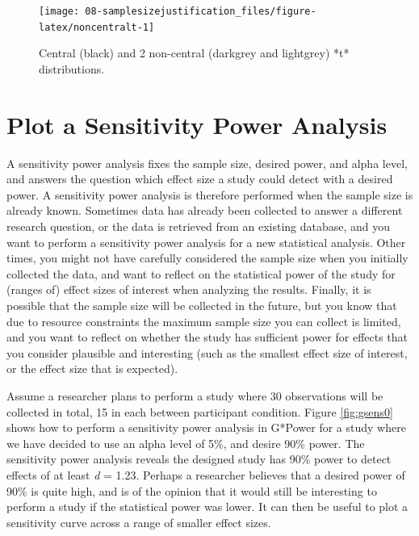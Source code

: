 \documentclass[
]{krantz}
\begin{document}
\begin{figure}

{\centering \texttt{[image: 08-samplesizejustification\_files/figure-latex/noncentralt-1]} 

}

\caption{Central (black) and 2 non-central (darkgrey and lightgrey) *t* distributions.}\label{fig:noncentralt}
\end{figure}

\hypertarget{plot-a-sensitivity-power-analysis}{%
\section{Plot a Sensitivity Power Analysis}\label{plot-a-sensitivity-power-analysis}}

A sensitivity power analysis fixes the sample size, desired power, and alpha level, and answers the question which effect size a study could detect with a desired power. A sensitivity power analysis is therefore performed when the sample size is already known. Sometimes data has already been collected to answer a different research question, or the data is retrieved from an existing database, and you want to perform a sensitivity power analysis for a new statistical analysis. Other times, you might not have carefully considered the sample size when you initially collected the data, and want to reflect on the statistical power of the study for (ranges of) effect sizes of interest when analyzing the results. Finally, it is possible that the sample size will be collected in the future, but you know that due to resource constraints the maximum sample size you can collect is limited, and you want to reflect on whether the study has sufficient power for effects that you consider plausible and interesting (such as the smallest effect size of interest, or the effect size that is expected).

Assume a researcher plans to perform a study where 30 observations will be collected in total, 15 in each between participant condition. Figure \ref{fig:gsens0} shows how to perform a sensitivity power analysis in G*Power for a study where we have decided to use an alpha level of 5\%, and desire 90\% power. The sensitivity power analysis reveals the designed study has 90\% power to detect effects of at least \emph{d} = 1.23. Perhaps a researcher believes that a desired power of 90\% is quite high, and is of the opinion that it would still be interesting to perform a study if the statistical power was lower. It can then be useful to plot a sensitivity curve across a range of smaller effect sizes.
\end{document}
